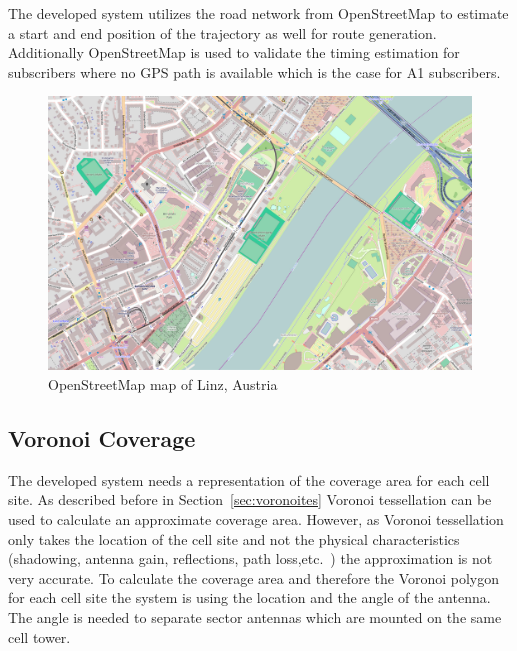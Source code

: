 The developed system utilizes the road network from OpenStreetMap to estimate a start and end position of the trajectory as well for route generation. Additionally OpenStreetMap is used to validate the timing estimation for subscribers where no GPS path is available which is the case for A1 subscribers. 
\begin{figure}
	\centering
	\includegraphics[width=0.7\linewidth]{./images/map_linz}
	\caption{OpenStreetMap map of Linz, Austria}
	\label{fig:map_linz}
\end{figure}

\subsection{Voronoi Coverage}
The developed system needs a representation of the coverage area for each cell site. As described before in Section~\ref{sec:voronoites} Voronoi tessellation can be used to calculate an approximate coverage area. However, as Voronoi tessellation only takes the location of the cell site and not the physical characteristics (shadowing, antenna gain, reflections, path loss,etc.\ ) the approximation is not very accurate. To calculate the coverage area and therefore the Voronoi polygon for each cell site the system is using the location and the angle of the antenna. The angle is needed to separate sector antennas which are mounted on the same cell tower. 
